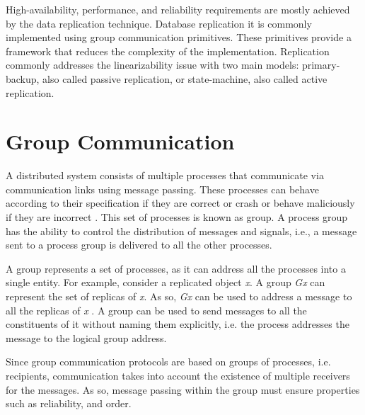 
High-availability, performance, and reliability requirements are mostly achieved by the data replication technique. Database replication it is commonly implemented using group communication primitives. These primitives provide a framework that reduces the complexity of the implementation. Replication commonly addresses the linearizability issue with two main models: primary-backup, also called passive replication, or state-machine, also called active replication.


\section{Group Communication}

A distributed system consists of multiple processes that communicate via communication links using message passing. These processes can behave according to their specification if they are correct or crash or behave maliciously if they are incorrect \cite{Guerraoui:1997p555}. This set of processes is known as group. A process group has the ability to control the distribution of messages and signals, i.e., a message sent to a process group is delivered to all the other processes. 

A group represents a set of processes, as it can address all the processes into a single entity. For example, consider a replicated object \textit{x}. A group \textit{Gx} can represent the set of replicas of \textit{x}. As so, \textit{Gx} can be used to address a message to all the replicas of \textit{x} \cite{Guerraoui96fault-toleranceby}. A group can be used to send messages to all the constituents of it without naming them explicitly, i.e. the process addresses the message to the logical group address.


Since group communication protocols are based on groups of processes, i.e. recipients, communication takes into account the existence of multiple receivers for the messages. As so, message passing within the group must ensure properties such as reliability, and order.

